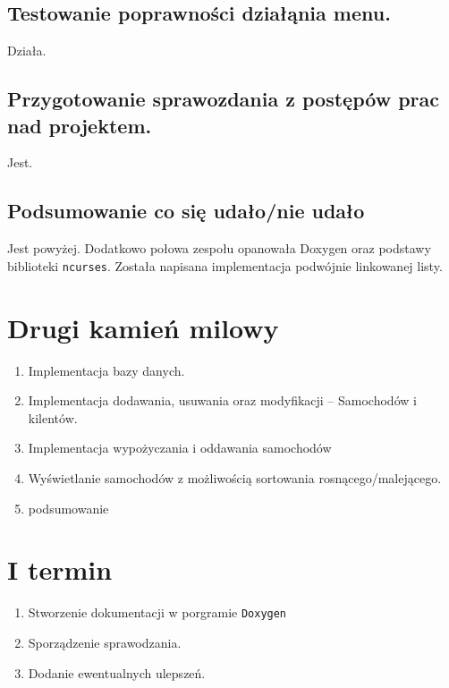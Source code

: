 \documentclass[11pt]{article}
\begin{document}
\subsection{Testowanie poprawności działąnia menu.}
\label{sec:org6a2918f}
Działa.
\subsection{Przygotowanie sprawozdania z postępów prac nad projektem.}
\label{sec:org5229f3f}
Jest.
\subsection{Podsumowanie co się udało/nie udało}
\label{sec:org5d1fdce}
Jest powyżej.
Dodatkowo połowa zespołu opanowała Doxygen oraz podstawy biblioteki \texttt{ncurses}.
Została napisana implementacja podwójnie linkowanej listy.
\section{Drugi kamień milowy}
\label{sec:orgd6decce}
\begin{enumerate}
\item Implementacja bazy danych.
\item Implementacja dodawania, usuwania oraz modyfikacji -- Samochodów i kilentów.
\item Implementacja wypożyczania i oddawania samochodów
\item Wyświetlanie samochodów z możliwością sortowania rosnącego/malejącego.
\item podsumowanie
\end{enumerate}
\section{I termin}
\label{sec:org603d5c7}
\begin{enumerate}
\item Stworzenie dokumentacji w porgramie \texttt{Doxygen}
\item Sporządzenie sprawodzania.
\item Dodanie ewentualnych ulepszeń.
\end{enumerate}
\end{document}
